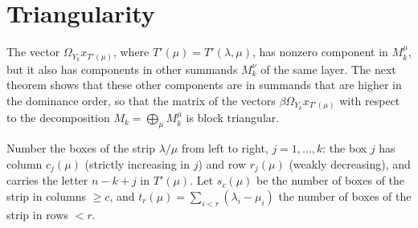 \documentclass[11pt, letterpaper]{amsart}
\theoremstyle{definition}
\theoremstyle{remark}
\begin{document}
\section{Triangularity}\label{sectri}

The vector $\Omega_{Y_k}x_{T'(\mu)}$, where $T'(\mu)=T'(\lambda,\mu)$, has nonzero component in $M_k^\mu$, but it also has components in other summands $M_k^{\nu}$ of the same layer. The next theorem shows that these other components are in summands that are higher in the dominance order, so that the matrix of the vectors $\beta \Omega_{Y_k}x_{T'(\mu)}$ with respect to the decomposition $M_k=\bigoplus_\mu M_k^\mu$ is block triangular.

Number the boxes of the strip $\lambda/\mu$ from left to right, $j=1,\dots,k$: the box $j$ has column $c_j(\mu)$ (strictly increasing in $j$) and row $r_j(\mu)$ (weakly decreasing), and carries the letter $n-k+j$ in $T'(\mu)$. Let $s_c(\mu)$ be the number of boxes of the strip in columns $\ge c$, and $t_r(\mu)=\sum_{i<r}(\lambda_i-\mu_i)$ the number of boxes of the strip in rows $<r$.
\end{document}
